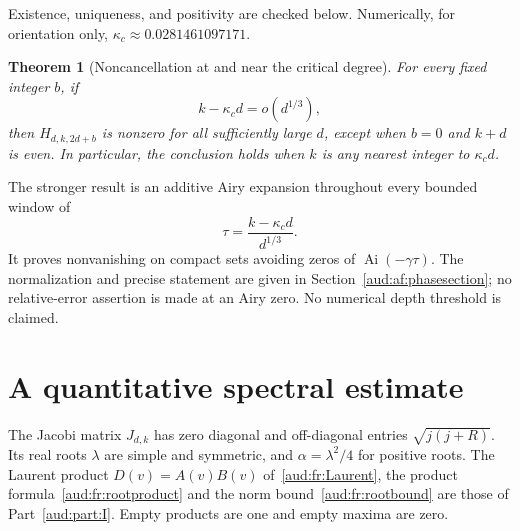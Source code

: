 \documentclass[11pt,a4paper]{article}
\numberwithin{equation}{section}
\newtheorem{theorem}{Theorem}[section]
\newcommand{\Ai}{\operatorname{Ai}}
\begin{document}
Existence, uniqueness, and positivity are checked below. Numerically, for orientation only, $\kappa_c\approx0.0281461097171$.

\begin{theorem}[Noncancellation at and near the critical degree]\label{aud:af:mainnonzero}
For every fixed integer $b$, if
\[
 k-\kappa_cd=o(d^{1/3}),
\]
then $H_{d,k,2d+b}$ is nonzero for all sufficiently large $d$, except when $b=0$ and $k+d$ is even. In particular, the conclusion holds when $k$ is any nearest integer to $\kappa_cd$.
\end{theorem}

The stronger result is an additive Airy expansion throughout every bounded window of
\[
 \tau=\frac{k-\kappa_cd}{d^{1/3}}.
\]
It proves nonvanishing on compact sets avoiding zeros of $\Ai(-\gamma\tau)$. The normalization and precise statement are given in Section~\ref{aud:af:phasesection}; no relative-error assertion is made at an Airy zero. No numerical depth threshold is claimed.

\section{A quantitative spectral estimate}
The Jacobi matrix $J_{d,k}$ has zero diagonal and off-diagonal entries $\sqrt{j(j+R)}$. Its real roots $\lambda$ are simple and symmetric, and $\alpha=\lambda^2/4$ for positive roots. The Laurent product $D(v)=A(v)B(v)$ of~\eqref{aud:fr:Laurent}, the product formula~\eqref{aud:fr:rootproduct} and the norm bound~\eqref{aud:fr:rootbound} are those of Part~\ref{aud:part:I}. Empty products are one and empty maxima are zero.
\end{document}
